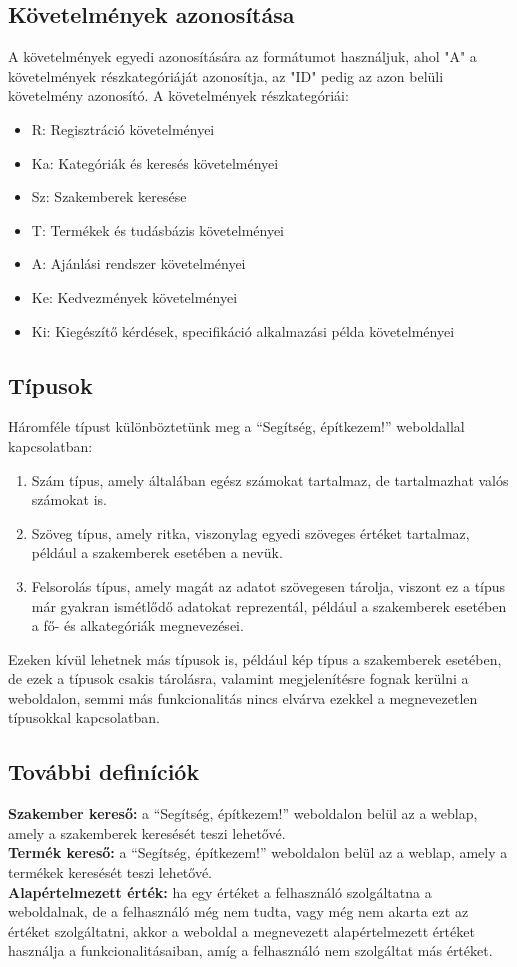 \subsection{Követelmények azonosítása}
A követelmények egyedi azonosítására az  formátumot használjuk, ahol "A" a követelmények részkategóriáját azonosítja, az "ID" pedig az azon belüli követelmény azonosító.
A követelmények részkategóriái:
\begin{itemize}
    \item R: Regisztráció követelményei
    \item Ka: Kategóriák és keresés követelményei
    \item Sz: Szakemberek keresése
    \item T: Termékek és tudásbázis követelményei
    \item A: Ajánlási rendszer követelményei
    \item Ke: Kedvezmények követelményei
    \item Ki: Kiegészítő kérdések, specifikáció alkalmazási példa követelményei
\end{itemize}

\subsection{Típusok}
Háromféle típust különböztetünk meg a “Segítség, építkezem!” weboldallal kapcsolatban:
\begin{enumerate}
    \item Szám típus, amely általában egész számokat tartalmaz, de tartalmazhat valós számokat is.
    \item Szöveg típus, amely ritka, viszonylag egyedi szöveges értéket tartalmaz, például a szakemberek esetében a nevük.
    \item Felsorolás típus, amely magát az adatot szövegesen tárolja, viszont ez a típus már gyakran ismétlődő adatokat reprezentál, például a szakemberek esetében a fő- és alkategóriák megnevezései.
\end{enumerate}

Ezeken kívül lehetnek más típusok is, például kép típus a szakemberek esetében, de ezek a típusok csakis tárolásra, valamint megjelenítésre fognak kerülni a weboldalon, semmi más funkcionalitás nincs elvárva ezekkel a megnevezetlen típusokkal kapcsolatban.


\subsection{További definíciók}
\textbf{Szakember kereső:} a “Segítség, építkezem!” weboldalon belül az a weblap, amely a szakemberek keresését teszi lehetővé.\\
\textbf{Termék kereső:} a “Segítség, építkezem!” weboldalon belül az a weblap, amely a termékek keresését teszi lehetővé.\\
\textbf{Alapértelmezett érték:} ha egy értéket a felhasználó szolgáltatna a weboldalnak, de a felhasználó még nem tudta, vagy még nem akarta ezt az értéket szolgáltatni, akkor a weboldal a megnevezett alapértelmezett értéket használja a funkcionalitásaiban, amíg a felhasználó nem szolgáltat más értéket.
